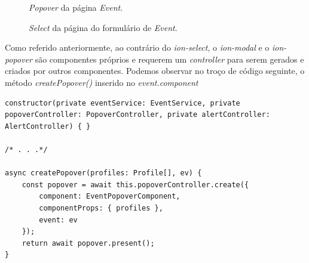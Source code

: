 \begin{figure}[h]
	\begin{center}
	\end{center}
	\caption{\textit{Popover} da página \textit{Event}.}\label{fig:eventpopover}
\end{figure}

\begin{figure}[h]
	\begin{center}
	\end{center}
	\caption{\textit{Select} da página do formulário de \textit{Event}.}\label{fig:eventformselect}
\end{figure}
 \newpage
 
Como referido anteriormente, ao contrário do \textit{ion-select}, o \textit{ion-modal} e o \textit{ion-popover} são componentes próprios e requerem um \textit{controller} para serem gerados e criados por outros componentes. Podemos observar no troço de código seguinte, o método \textit{createPopover()} inserido no \textit{event.component}

\begin{lstlisting}
constructor(private eventService: EventService, private popoverController: PopoverController, private alertController: AlertController) { }

/* . . .*/

async createPopover(profiles: Profile[], ev) {
	const popover = await this.popoverController.create({
		component: EventPopoverComponent,
		componentProps: { profiles },
		event: ev
	});
	return await popover.present();
}
\end{lstlisting}



